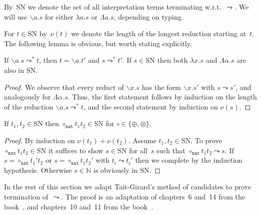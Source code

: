 \documentclass[a4paper,UKenglish,cleveref,autoref,numberwithinsect]{lipics-v2019}
\theoremstyle{definition}
\newcommand{\abstraction}[2]{\backslash #1.#2}
\newcommand{\abs}[2]{\lambda #1.#2}
\newcommand{\tabs}[2]{\Lambda #1.#2}
\newcommand{\arrW}{\leadsto}
\newcommand{\nat}{\mathtt{nat}}
\newcommand{\SN}{\mathrm{SN}}
\begin{document}
By~$\SN$ we denote the set of all interpretation terms terminating
w.r.t.~$\arrW$. We will use $\abstraction{a}{s}$ for either
$\abs{a}{s}$ or $\tabs{a}{s}$, depending on typing.

For $t \in \SN$ by~$\nu(t)$ we denote the length of the longest
reduction starting at~$t$. The following lemma is obvious, but worth
stating explicitly.

\begin{lemma}\label{lem_reduce_abs}
  If $\abstraction{a}{s} \arrW^* t$, then $t = \abstraction{a}{t'}$
  and $s \arrW^* t'$.  If $s \in \SN$ then both $\abs{x}{s}$ and
  $\tabs{\alpha}{s}$ are also in $\SN$.
\end{lemma}

\begin{proof}
  We observe that every reduct of $\abstraction{x}{s}$ has the form
  $\abstraction{x}{s'}$ with $s \arrW s'$, and analogously for
  $\tabs{\alpha}{s}$.  Thus, the first statement follows by induction
  on the length of the reduction $\abstraction{a}{s} \arrW^* t$,
  and the second statement by induction on $\nu(s)$.
\end{proof}

\begin{lemma}\label{lem_circ_sn_base}
  If $t_1,t_2 \in \SN$ then $\circ_\nat t_1 t_2 \in \SN$ for $\circ
  \in \{\oplus,\otimes\}$.
\end{lemma}

\begin{proof}
  By induction on $\nu(t_1) + \nu(t_2)$. Assume $t_1,t_2 \in \SN$. To
  prove $\circ_\nat t_1 t_2 \in \SN$ it suffices to show $s \in \SN$
  for all~$s$ such that $\circ_\nat t_1 t_2 \arrW s$. If $s =
  \circ_\nat t_1' t_2$ or $s = \circ_\nat t_1 t_2'$ with $t_i \arrW
  t_i'$ then we complete by the induction hypothesis. Otherwise $s \in
  \mathbb{N}$ is obviously in $\SN$.
\end{proof}

In the rest of this section we adapt Tait-Girard's method of candidates
to prove termination of~$\arrW$. The proof is an adaptation of
chapters~6 and~14 from the book~\cite{Girard1989}, and chapters~10
and~11 from the book~\cite{SorensenUrzyczyn2006}.
\end{document}
